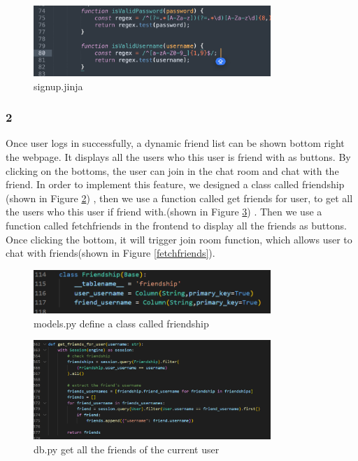 \documentclass[12pt]{article}
\begin{document}
        \begin{figure}[H]
            \centering
            \includegraphics[width=0.8\textwidth]{graphs/sign_up_xss.jpg}
            \caption{signup.jinja}
            \label{signup xss}
        \end{figure}

        \subsubsection*{2} Once user logs in successfully, a dynamic friend list can be shown bottom right the webpage. It displays all the users who this user is friend with as buttons. By clicking on the bottoms, the user can join in the chat room and chat with the friend. In order to implement this feature, we designed a class called friendship (shown in Figure \ref{friendshipClass}) , then we use a function called get friends for user, to get all the users who this user if friend with.(shown in Figure \ref{getfriends}) . Then we use a function called fetchfriends in the frontend to display all the friends as buttons. Once clicking the bottom, it will trigger join room function, which allows user to chat with friends(shown in Figure \ref{fetchfriends}).

        \begin{figure}[H]
            \centering
            \includegraphics[width=0.8\textwidth]{zzrgraphs/models_friendship.png}
            \caption{models.py define a class called friendship}
            \label{friendshipClass}
        \end{figure}

        \begin{figure}[H]
                \centering
                \includegraphics[width=0.8\textwidth]{zzrgraphs/db_getfriendforuser.png}
                \caption{db.py get all the friends of the current user}
                \label{getfriends}
            \end{figure}
\end{document}
